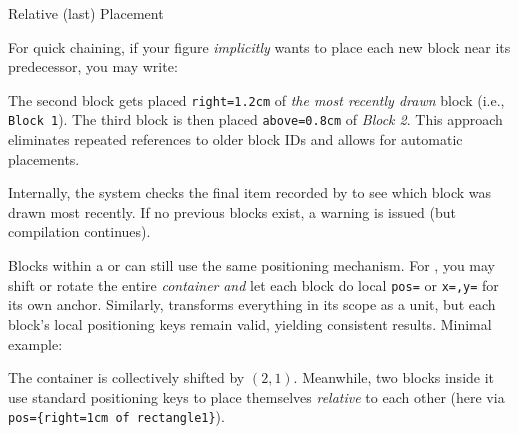 \documentclass[show-experimental]{l3doc}
\begin{document}
\begin{variable}{Relative (last) Placement}
	\begin{syntax}
	\end{syntax}
	For quick chaining, if your figure \emph{implicitly} wants to place each new
	block near its predecessor, you may write:
	\begin{nskusage}
		\nskBlock[x=0, y=0, text-center={Block 1}]
		\nskBlock[
			last-pos={right=1.2cm},
			text-center={Block 2}
		]
		\nskBlock[
			last-pos={above=0.8cm},
			text-center={Block 3}
		]
	\end{nskusage}
	The second block gets placed \verb|right=1.2cm| of \emph{the most recently drawn}
	block (i.e., \verb|Block 1|). The third block is then placed \verb|above=0.8cm|
	of \emph{Block 2}. This approach eliminates repeated references to older block
	IDs and allows for automatic placements.

	\begin{texnote}
		Internally, the system checks the final item recorded by \cs{nskBlockIDLast}
		to see which block was drawn most recently. If no previous blocks exist, a
		warning is issued (but compilation continues).
	\end{texnote}
\end{variable}


Blocks within a  or  can still use the same
positioning mechanism. For , you may shift or rotate the
entire \emph{container} \emph{and} let each block do local \verb|pos=| or
\verb|x=,y=| for its own anchor. Similarly,  transforms everything
in its scope as a unit, but each block’s local positioning keys remain valid,
yielding consistent results. Minimal example:
\begin{nskusage}
	\nskContainer[
		fill=nskLightGray,
		shift-x=2,
		shift-y=1
	]
	{
		\nskBlock[x=0, y=0, text-center={Inside Container}]
		\nskBlock[pos={right=1cm of rectangle1}]
	}
\end{nskusage}

The container is collectively shifted by \(\left(2,1\right)\). Meanwhile,
two blocks inside it use standard positioning keys to place themselves
\emph{relative} to each other (here via \verb|pos={right=1cm of rectangle1}|).
\end{document}
